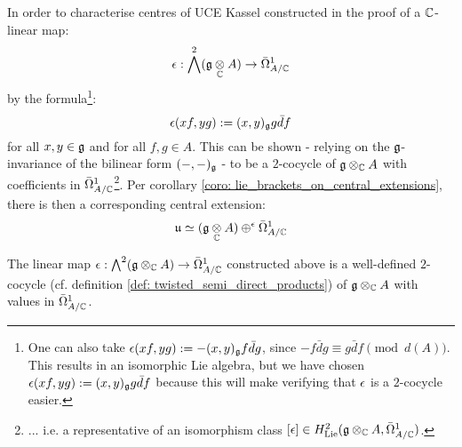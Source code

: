         In order to characterise centres of UCE Kassel constructed in the proof of \cite[Theorem 3.3(iii)]{kassel_universal_central_extensions_of_lie_algebras} a $\mathbb{C}$-linear map:
            $$\e: \bigwedge^2 (\g \tensor_{\bbC} A) \to \bar{\Omega}^1_{A/\bbC}$$
        by the formula\footnote{One can also take $\epsilon(x f, y g) := -(x, y)_{\mathfrak{g}} f \bar{d}g$, since $-f \bar{d}g \equiv g \bar{d}f \pmod{d(A)}$. This results in an isomorphic Lie algebra, but we have chosen $\epsilon(x f, y g) := (x, y)_{\mathfrak{g}} g \bar{d}f$ because this will make verifying that $\epsilon$ is a $2$-cocycle easier.}:
            $$\epsilon(x f, y g) := (x, y)_{\mathfrak{g}} g \bar{d}f$$
        for all $x, y \in \mathfrak{g}$ and for all $f, g \in A$. This can be shown - relying on the $\mathfrak{g}$-invariance of the bilinear form $(-, -)_{\mathfrak{g}}$ - to be a $2$-cocycle of $\g \tensor_{\bbC} A$ with coefficients in $\bar{\Omega}^1_{A/\mathbb{C}}$\footnote{... i.e. a representative of an isomorphism class $[\e] \in H^2_{\Lie}(\g \tensor_{\bbC} A, \bar{\Omega}^1_{A/\bbC})$.}. Per corollary \ref{coro: lie_brackets_on_central_extensions}, there is then a corresponding central extension:
            $$\fraku \cong (\g \tensor_{\bbC} A) \oplus^{\e} \bar{\Omega}_{A/\bbC}^1$$
        \begin{lemma} \label{lemma: lie_brackets_on_UCEs_of_current_algebras}
            The linear map $\e: \bigwedge^2 (\g \tensor_{\bbC} A) \to \bar{\Omega}^1_{A/\bbC}$ constructed above is a well-defined $2$-cocycle (cf. definition \ref{def: twisted_semi_direct_products}) of $\g \tensor_{\bbC} A$ with values in $\bar{\Omega}^1_{A/\mathbb{C}}$.
        \end{lemma}
